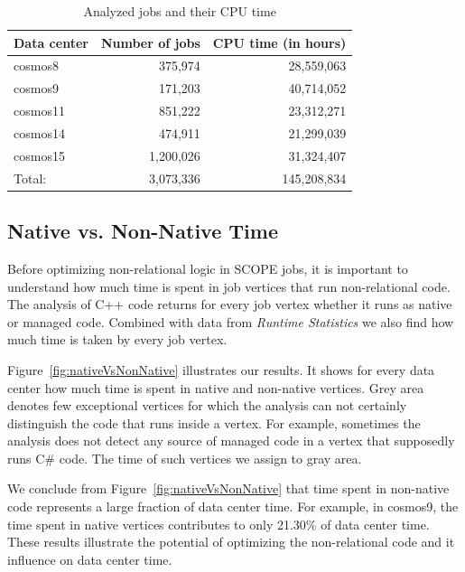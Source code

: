\begin{table}[ht]
\centering
\begin{tabular}{lrr}

  Data center & Number of jobs & CPU time (in hours) \\
 \midrule
cosmos8 & 375,974 & 28,559,063 \\
cosmos9 & 171,203 & 40,714,052 \\
cosmos11 & 851,222 & 23,312,271\\
cosmos14 & 474,911 & 21,299,039\\
cosmos15 & 1,200,026 & 31,324,407 \\
\midrule
Total: & 3,073,336 & 145,208,834\\
\midrule

\end{tabular}
 \label{tb:projects}
 \caption{Analyzed jobs and their CPU time}
\end{table}




\subsection{Native vs. Non-Native Time}
Before optimizing non-relational logic in SCOPE jobs, it is important to understand how much time is spent in job vertices that run non-relational code. 
The analysis of C++ code returns for every job vertex whether it runs as native or managed code. 
Combined with data from \emph{Runtime Statistics} we also find how much time is taken by every job vertex.

Figure~\ref{fig:nativeVsNonNative} illustrates our results.
It shows for every data center how much time is spent in native and non-native vertices. 
Grey area denotes few exceptional vertices for which the analysis can not certainly distinguish the code that runs inside a vertex. 
For example, sometimes the analysis does not detect any source of managed code in a vertex that supposedly runs C\# code. 
The time of such vertices we assign to gray area.

We conclude from Figure~\ref{fig:nativeVsNonNative} that time spent in non-native code represents a large fraction of data center time.
For example, in cosmos9, the time spent in native vertices contributes to only 21.30\% of data center time. 
These results illustrate the potential of optimizing the non-relational code and it influence on data center time.

